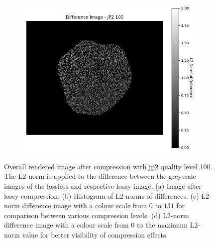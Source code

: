 \begin{figure}[htb]
\begin{subfigure}[b]{0.48\textwidth}
    \end{subfigure}
    \begin{subfigure}[b]{0.48\textwidth}
        \centering
        \includegraphics[width=\textwidth]{doc/thesis/0_figures/compare_quality/set1/jp2_100_diff_heatmap_rel.png}
        \caption{}
        \label{fig:img_quality_comp_jp2_100_diff_rel}
    \end{subfigure}
    \caption{Overall rendered image after compression with \gls{jp2} quality level 100. The L2-norm is applied to the difference between the greyscale images of the lossless and respective lossy image. (a) Image after lossy compression. (b) Histogram of L2-norms of differences. (c) L2-norm difference image with a colour scale from $0$ to $131$ for comparison between various compression levels. (d) L2-norm difference image with a colour scale from $0$ to the maximum L2-norm value for better visibility of compression effects.}
    \label{fig:img_quality_comp_jp2_100}
\end{figure}


